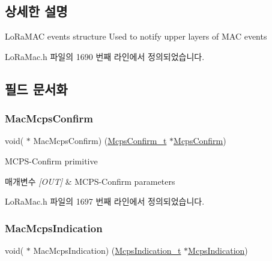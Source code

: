 \subsection{상세한 설명}
Lo\+Ra\+M\+AC events structure Used to notify upper layers of M\+AC events 

Lo\+Ra\+Mac.\+h 파일의 1690 번째 라인에서 정의되었습니다.



\subsection{필드 문서화}
\mbox{\label{structs_lo_ra_mac_primitives_a2b7cb648bbe609f5fb6fe4e3d0bcda41}} 
\subsubsection{\texorpdfstring{Mac\+Mcps\+Confirm}{MacMcpsConfirm}}
{\footnotesize\ttfamily void( $\ast$ Mac\+Mcps\+Confirm) (\mbox{\hyperlink{group___l_o_r_a_m_a_c_ga925536babf8abe83918a19f5ae88bd44}{Mcps\+Confirm\+\_\+t}} $\ast$\mbox{\hyperlink{lora_8c_a7e94673a3e7e54cf2e49675d12189070}{Mcps\+Confirm}})}



M\+C\+P\+S-\/\+Confirm primitive 


\begin{DoxyParams}{매개변수}
{\em \mbox{[}\+O\+U\+T\mbox{]}} & M\+C\+P\+S-\/\+Confirm parameters \\
\hline
\end{DoxyParams}


Lo\+Ra\+Mac.\+h 파일의 1697 번째 라인에서 정의되었습니다.

\mbox{\label{structs_lo_ra_mac_primitives_a89cb88517df5ff62828e4cf29454d9e5}} 
\subsubsection{\texorpdfstring{Mac\+Mcps\+Indication}{MacMcpsIndication}}
{\footnotesize\ttfamily void( $\ast$ Mac\+Mcps\+Indication) (\mbox{\hyperlink{group___l_o_r_a_m_a_c_ga202591b6553d63fae89bd42787496616}{Mcps\+Indication\+\_\+t}} $\ast$\mbox{\hyperlink{lora_8c_aa62f56dcd70e02213fc6e5d0f04b3d1c}{Mcps\+Indication}})}



